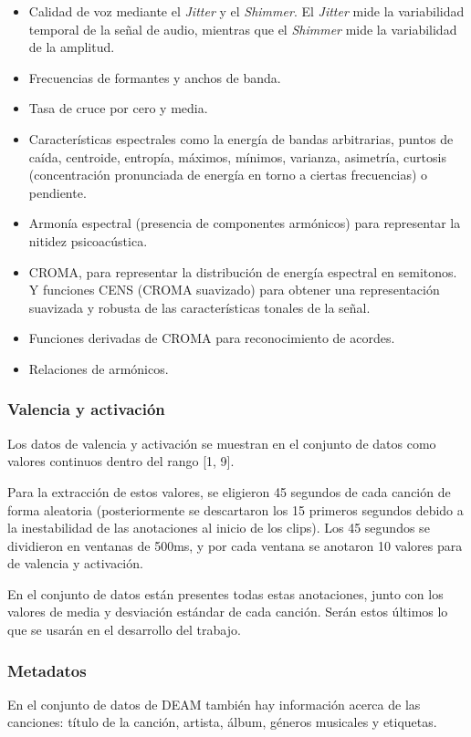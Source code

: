 \documentclass[12pt,a4paper]{article}
\begin{document}
\begin{itemize}
	\item Calidad de voz mediante el \textit{Jitter} y el \textit{Shimmer}. El \textit{Jitter} mide la variabilidad temporal de la señal de audio, mientras que el \textit{Shimmer} mide la variabilidad de la amplitud.
	\item Frecuencias de formantes y anchos de banda.
	\item Tasa de cruce por cero y media.
	\item Características espectrales como la energía de bandas arbitrarias, puntos de caída, centroide, entropía, máximos, mínimos, varianza, asimetría, curtosis (concentración pronunciada de energía en torno a ciertas frecuencias) o pendiente.
	\item Armonía espectral (presencia de componentes armónicos) para representar la nitidez psicoacústica.
	\item CROMA, para representar la distribución de energía espectral en semitonos. Y funciones CENS (CROMA suavizado) para obtener una representación suavizada y robusta de las características tonales de la señal.
	\item Funciones derivadas de CROMA para reconocimiento de acordes.
	\item Relaciones de armónicos.
\end{itemize}

\subsubsection{Valencia y activación}
Los datos de valencia y activación se muestran en el conjunto de datos como valores continuos dentro del rango [1, 9].


Para la extracción de estos valores, se eligieron 45 segundos de cada canción de forma aleatoria (posteriormente se descartaron los 15 primeros segundos debido a la inestabilidad de las anotaciones al inicio de los clips). Los 45 segundos se dividieron en ventanas de 500ms, y por cada ventana se anotaron 10 valores para de valencia y activación.


En el conjunto de datos están presentes todas estas anotaciones, junto con los valores de media y desviación estándar de cada canción. Serán estos últimos lo que se usarán en el desarrollo del trabajo.



\subsubsection{Metadatos}
En el conjunto de datos de DEAM \cite{AlajankiEmoInMusicAnalysis} también hay información acerca de las canciones: título de la canción, artista, álbum, géneros musicales y etiquetas.
\end{document}
